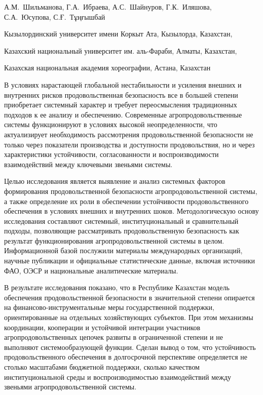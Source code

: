 
\begin{header}

А.М.~Шильманова\envelope,
Г.А.~Ибраева,
А.С.~Шайнуров,
Г.К.~Иляшова,
С.А.~Юсупова,
С.Ғ.~Тұңғышбай
\end{header}

\begin{affil}
Кызылординский университет имени Коркыт Ата, Кызылорда, Казахстан,

Казахский национальный университет им. аль-Фараби, Алматы, Казахстан,

Казахская национальная академия хореографии, Астана, Казахстан

\end{affil}

В условиях нарастающей глобальной нестабильности и усиления внешних и
внутренних рисков продовольственная безопасность все в большей степени
приобретает системный характер и требует переосмысления традиционных
подходов к ее анализу и обеспечению. Современные агропродовольственные
системы функционируют в условиях высокой неопределенности, что
актуализирует необходимость рассмотрения продовольственной безопасности
не только через показатели производства и доступности продовольствия, но
и через характеристики устойчивости, согласованности и воспроизводимости
взаимодействий между ключевыми звеньями системы.

Целью исследования является выявление и анализ системных факторов
формирования продовольственной безопасности агропродовольственной
системы, а также определение их роли в обеспечении устойчивости
продовольственного обеспечения в условиях внешних и внутренних шоков.
Методологическую основу исследования составляют системный,
институциональный и сравнительный подходы, позволяющие рассматривать
продовольственную безопасность как результат функционирования
агропродовольственной системы в целом. Информационной базой послужили
материалы международных организаций, научные публикации и официальные
статистические данные, включая источники ФАО, ОЭСР и национальные
аналитические материалы.

В результате исследования показано, что в Республике Казахстан модель
обеспечения продовольственной безопасности в значительной степени
опирается на финансово-инструментальные меры государственной поддержки,
ориентированные на отдельных хозяйствующих субъектов. При этом механизмы
координации, кооперации и устойчивой интеграции участников
агропродовольственных цепочек развиты в ограниченной степени и не
выполняют системообразующей функции. Сделан вывод о том, что
устойчивость продовольственного обеспечения в долгосрочной перспективе
определяется не столько масштабами бюджетной поддержки, сколько
качеством институциональной среды и воспроизводимостью взаимодействий
между звеньями агропродовольственной системы.

